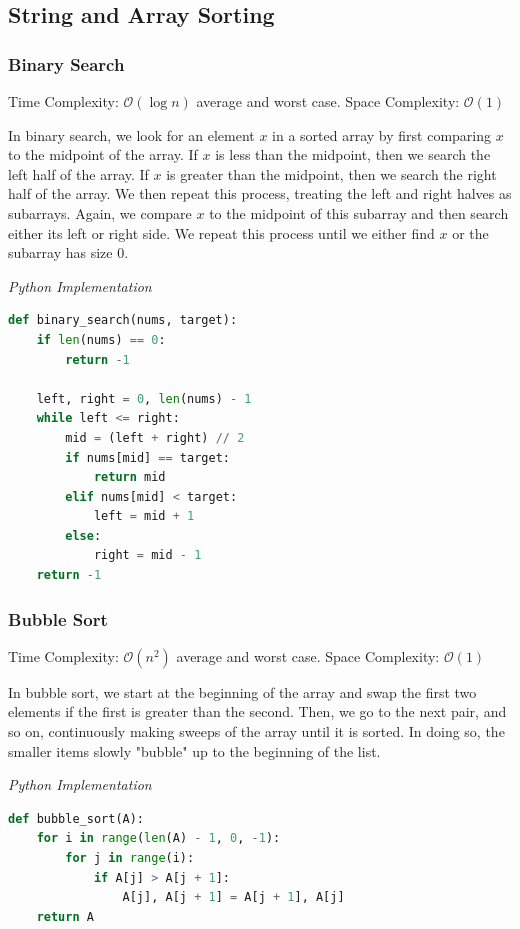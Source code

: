 \documentclass{article}
\newcommand{\bigO}{\mathcal{O}}
\begin{document}
    \subsection{String and Array Sorting}
    \subsubsection{Binary Search}
    Time Complexity: $\bigO(\log n)$ average and worst case.  Space Complexity: $\bigO(1)$
    
    In binary search, we look for an element $x$ in a sorted array by first comparing $x$ to the midpoint of the array. If $x$ is less than the midpoint, then we search the left half of the array. If $x$ is greater than the midpoint, then we search the right half of the array. We then repeat this process, treating the left and right halves as subarrays. Again, we compare $x$ to the midpoint of this subarray and then search either its left or right side. We repeat this process until we either find $x$ or the subarray has size 0.

\vspace{8pt} \emph{Python Implementation}
\begin{lstlisting}[language=Python]
def binary_search(nums, target):
    if len(nums) == 0:
        return -1

    left, right = 0, len(nums) - 1
    while left <= right:
        mid = (left + right) // 2
        if nums[mid] == target:
            return mid
        elif nums[mid] < target:
            left = mid + 1
        else:
            right = mid - 1
    return -1
\end{lstlisting}
    
    \subsubsection{Bubble Sort}
    Time Complexity: $\bigO(n^2)$ average and worst case. Space Complexity: $\bigO(1)$
     
    In bubble sort, we start at the beginning of the array and swap the first two elements if the first is greater than the second. Then, we go to the next pair, and so on, continuously making sweeps of the array until it is
    sorted. In doing so, the smaller items slowly "bubble" up to the beginning of the list. 

\vspace{8pt} \emph{Python Implementation}
\begin{lstlisting}[language=Python]
def bubble_sort(A):
    for i in range(len(A) - 1, 0, -1):
        for j in range(i):
            if A[j] > A[j + 1]:
                A[j], A[j + 1] = A[j + 1], A[j]
    return A
\end{lstlisting}
\end{document}
